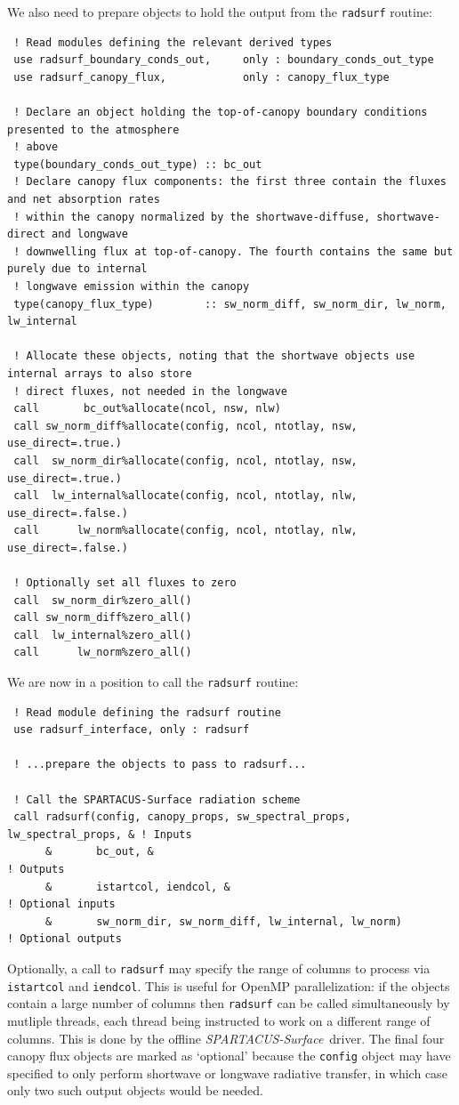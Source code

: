 \documentclass[a4,oneside]{article}
\def\codesize{\small}
\def\spsurf{\emph{SPARTACUS-Surface}}
\def\code#1{{\codesize\texttt{#1}}}
\begin{document}
We also need to prepare objects to hold the output from the
\code{radsurf} routine:
\begin{lstlisting}
 ! Read modules defining the relevant derived types
 use radsurf_boundary_conds_out,     only : boundary_conds_out_type
 use radsurf_canopy_flux,            only : canopy_flux_type

 ! Declare an object holding the top-of-canopy boundary conditions presented to the atmosphere
 ! above
 type(boundary_conds_out_type) :: bc_out 
 ! Declare canopy flux components: the first three contain the fluxes and net absorption rates
 ! within the canopy normalized by the shortwave-diffuse, shortwave-direct and longwave
 ! downwelling flux at top-of-canopy. The fourth contains the same but purely due to internal 
 ! longwave emission within the canopy
 type(canopy_flux_type)        :: sw_norm_diff, sw_norm_dir, lw_norm, lw_internal 

 ! Allocate these objects, noting that the shortwave objects use internal arrays to also store 
 ! direct fluxes, not needed in the longwave
 call       bc_out%allocate(ncol, nsw, nlw)
 call sw_norm_diff%allocate(config, ncol, ntotlay, nsw, use_direct=.true.)
 call  sw_norm_dir%allocate(config, ncol, ntotlay, nsw, use_direct=.true.)
 call  lw_internal%allocate(config, ncol, ntotlay, nlw, use_direct=.false.)
 call      lw_norm%allocate(config, ncol, ntotlay, nlw, use_direct=.false.)

 ! Optionally set all fluxes to zero
 call  sw_norm_dir%zero_all()
 call sw_norm_diff%zero_all()
 call  lw_internal%zero_all()
 call      lw_norm%zero_all()
\end{lstlisting}

We are now in a position to call the \code{radsurf} routine:
\begin{lstlisting}
 ! Read module defining the radsurf routine
 use radsurf_interface, only : radsurf

 ! ...prepare the objects to pass to radsurf...

 ! Call the SPARTACUS-Surface radiation scheme
 call radsurf(config, canopy_props, sw_spectral_props, lw_spectral_props, & ! Inputs
      &       bc_out, &                                                     ! Outputs
      &       istartcol, iendcol, &                                         ! Optional inputs
      &       sw_norm_dir, sw_norm_diff, lw_internal, lw_norm)              ! Optional outputs
\end{lstlisting}
Optionally, a call to \code{radsurf} may specify the range of columns
to process via \code{istartcol} and \code{iendcol}.  This is useful
for OpenMP parallelization: if the objects contain a large number of
columns then \code{radsurf} can be called simultaneously by mutliple
threads, each thread being instructed to work on a different range of
columns.  This is done by the offline \spsurf\ driver. The final four
canopy flux objects are marked as `optional' because the \code{config}
object may have specified to only perform shortwave or longwave
radiative transfer, in which case only two such output objects would
be needed.
\end{document}
